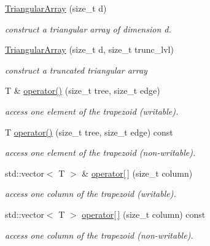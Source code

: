 \begin{DoxyCompactItemize}
\item 
\hyperlink{classvinecopulib_1_1_triangular_array_ab291264bdad179aed275517243cdad68}{Triangular\+Array} (size\+\_\+t d)
\begin{DoxyCompactList}\small\item\em construct a triangular array of dimension {\ttfamily d}. \end{DoxyCompactList}\item 
\hyperlink{classvinecopulib_1_1_triangular_array_a6c4a21f452a2c8094d452996f1f58401}{Triangular\+Array} (size\+\_\+t d, size\+\_\+t trunc\+\_\+lvl)
\begin{DoxyCompactList}\small\item\em construct a truncated triangular array \end{DoxyCompactList}\item 
T \& \hyperlink{classvinecopulib_1_1_triangular_array_aeaee00fbe12f2bce4bf7f2a4479417f3}{operator()} (size\+\_\+t tree, size\+\_\+t edge)
\begin{DoxyCompactList}\small\item\em access one element of the trapezoid (writable). \end{DoxyCompactList}\item 
T \hyperlink{classvinecopulib_1_1_triangular_array_a9909caab2252198416abcb3294181dee}{operator()} (size\+\_\+t tree, size\+\_\+t edge) const
\begin{DoxyCompactList}\small\item\em access one element of the trapezoid (non-\/writable). \end{DoxyCompactList}\item 
std\+::vector$<$ T $>$ \& \hyperlink{classvinecopulib_1_1_triangular_array_a30cdac9d2e0e13bce3c6c054283b6fb7}{operator\mbox{[}$\,$\mbox{]}} (size\+\_\+t column)
\begin{DoxyCompactList}\small\item\em access one column of the trapezoid (writable). \end{DoxyCompactList}\item 
std\+::vector$<$ T $>$ \hyperlink{classvinecopulib_1_1_triangular_array_a3e6654bb40de5c4b615ea37a8ffecac1}{operator\mbox{[}$\,$\mbox{]}} (size\+\_\+t column) const
\begin{DoxyCompactList}\small\item\em access one column of the trapezoid (non-\/writable). \end{DoxyCompactList}\item 

\end{DoxyCompactItemize}
